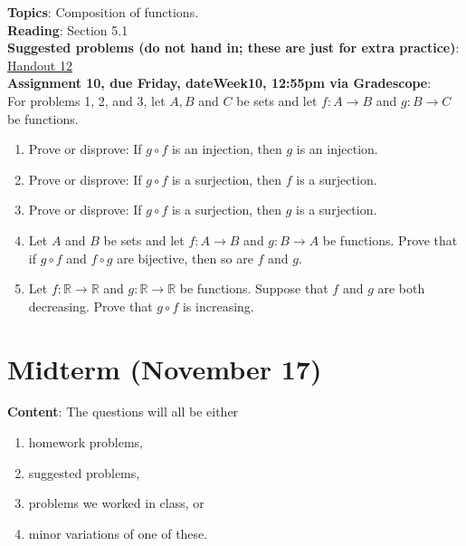 \documentclass[12pt]{article}
\newcommand{\HWdueTime}{12:55pm }
\newcommand{\warning}{
\smallskip
\begin{center}
  {\color{red} {\huge\Stopsign} \hspace{1pt}  IN PROGRESS!} {\color{blue}Check back later for the final assignment.} {\color{red} {\huge\Stopsign} }
\end{center}
\smallskip
\AddToShipoutPictureBG*{\AtTextLowerLeft{\llap{\rotatebox[origin=lb]{90}{\large\sffamily\hspace{2.5in}
  {\color{red} {\huge\Stopsign} \hspace{1pt}  IN PROGRESS!} {\color{blue}Check back later for the final assignment.} {\color{red} {\huge\Stopsign} }
      }\quad\rule{0.8pt}{\textheight}\enspace}}}
}
\newcommand{\R}{{\mathbb R}}
\begin{document}

\noindent\textbf{Topics}: Composition of functions.
\\

\noindent \textbf{Reading}: Section 5.1
\\


\noindent \textbf{Suggested problems (do not hand in; these are just for extra practice)}: \href{https://www.math.emory.edu/~dzb/teaching/250Fall2021/handouts/250-H12-compositions.pdf}{Handout 12}
\\

\noindent \textbf{Assignment 10, due Friday, \csname dateWeek10\endcsname, \HWdueTime via Gradescope}:
\\

\noindent For problems 1, 2, and 3, let $A, B$ and $C$ be sets and let $f \colon A \to B$ and $g \colon B \to C$ be functions. 
 \begin{enumerate}
 \item Prove or disprove: If $g\circ f$ is an injection, then $g$ is an injection.
 \item Prove or disprove: If $g\circ f$ is a surjection, then $f$ is a surjection.
 \item Prove or disprove: If $g\circ f$ is a surjection, then $g$ is a surjection.


\item Let $A$ and $B$ be sets and let $f \colon A \to B$ and $g \colon B \to A$ be functions. Prove that if $g \circ f$ and $f \circ g$ are bijective, then so are $f$ and $g$.

 \item Let $f \colon \R \to \R$ and $g \colon \R \to \R$ be functions. Suppose that $f$ and $g$ are both decreasing. Prove that $g \circ f$ is increasing.
 \end{enumerate}



\newpage
\section[ (November 17) Midterm]{Midterm (November 17)}


\noindent \textbf{Content}: The questions will all be either
\begin{enumerate}
\item homework problems,
\item suggested problems,
\item problems we worked in class, or
\item minor variations of one of these.
\end{enumerate}
\end{document}
